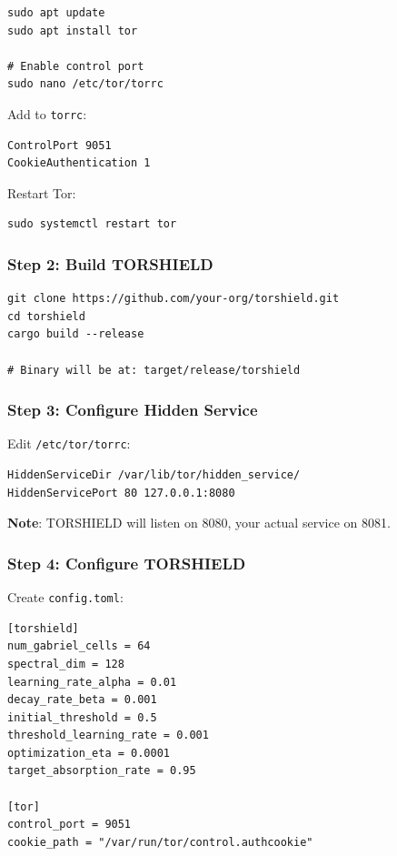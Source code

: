 \documentclass[11pt,a4paper]{article}
\begin{document}
\begin{verbatim}
sudo apt update
sudo apt install tor

# Enable control port
sudo nano /etc/tor/torrc
\end{verbatim}

Add to \texttt{torrc}:
\begin{verbatim}
ControlPort 9051
CookieAuthentication 1
\end{verbatim}

Restart Tor:
\begin{verbatim}
sudo systemctl restart tor
\end{verbatim}

\subsubsection{Step 2: Build TORSHIELD}

\begin{verbatim}
git clone https://github.com/your-org/torshield.git
cd torshield
cargo build --release

# Binary will be at: target/release/torshield
\end{verbatim}

\subsubsection{Step 3: Configure Hidden Service}

Edit \texttt{/etc/tor/torrc}:
\begin{verbatim}
HiddenServiceDir /var/lib/tor/hidden_service/
HiddenServicePort 80 127.0.0.1:8080
\end{verbatim}

\textbf{Note}: TORSHIELD will listen on 8080, your actual service on 8081.

\subsubsection{Step 4: Configure TORSHIELD}

Create \texttt{config.toml}:
\begin{verbatim}
[torshield]
num_gabriel_cells = 64
spectral_dim = 128
learning_rate_alpha = 0.01
decay_rate_beta = 0.001
initial_threshold = 0.5
threshold_learning_rate = 0.001
optimization_eta = 0.0001
target_absorption_rate = 0.95

[tor]
control_port = 9051
cookie_path = "/var/run/tor/control.authcookie"
\end{verbatim}
\end{document}
